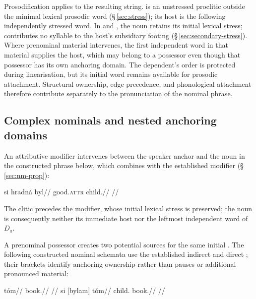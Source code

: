 Prosodification applies to the resulting string.  is an
unstressed proclitic outside the minimal lexical prosodic word
(§\,\ref{sec:stress}); its host is the following independently stressed
word. In  and , the noun retains its initial lexical
stress;  contributes no syllable to the host's subsidiary footing
(§\,\ref{sec:secondary-stress}). Where prenominal material intervenes,
the first independent word in that material supplies the host, which may belong to a possessor even though
that possessor has its own anchoring domain. The dependent's order is protected
during linearisation, but its initial word remains available for prosodic
attachment. Structural ownership, edge precedence, and phonological attachment
therefore contribute separately to the pronunciation of the nominal phrase.

\subsection{Complex nominals and nested anchoring domains}
\label{sec:nm-si-complex}

An attributive modifier intervenes between the speaker anchor and the noun
in the constructed phrase below, which combines  with the
established modifier  (§\,\ref{sec:nm-prop}):

\pex
\a
\begingl
\gla si hradná byl//
\glb \Sanch{} good.\textsc{attr} child.\Dir{}//
\glft {}//
\endgl
\xe

\noindent The clitic precedes the modifier, whose initial lexical stress
is preserved; the noun is consequently neither its immediate host nor the
leftmost independent word of $D_a$.

A prenominal possessor creates two potential sources for the same initial
. The following constructed nominal schemata use the established
indirect  and direct ; their brackets identify anchoring
ownership rather than pauses or additional pronounced material:

\pex
\a
\begingl
\gla {[si bylam]} tóm//
 book.\Dir{}//
\glft {}
//
\endgl
\a
\begingl
\gla si {[bylam] tóm}//
\glb \Sanch{} {child.\Ind{} book.\Dir{}}//
\glft {}
//
\endgl
\xe

